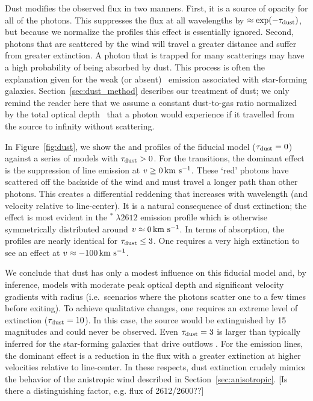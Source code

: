 \documentclass[12pt,preprint]{aastex}
\begin{document}
Dust modifies the observed flux in two manners. 
First, it is a source of opacity for all of 
the photons.  This suppresses the flux at all
wavelengths by $\approx \exp(-\tau_{\rm dust})$, but because we normalize the profiles 
this effect is essentially ignored.  Second, photons that are
scattered by the wind will travel a greater
distance and suffer from greater extinction.  A photon that is
trapped for many scatterings may have a high probability of being absorbed
by dust.  This process is
often the explanation given for the weak (or absent) \lya\ emission
associated with star-forming galaxies. 
Section~\ref{sec:dust_method} describes our treatment of dust; we only
remind the reader here that we assume a constant dust-to-gas ratio 
normalized by the total optical
depth \taud\ that a photon would experience if it travelled from the
source to infinity without scattering. 

In Figure~\ref{fig:dust}, we show the  and 
profiles of the fiducial model ($\tau_{\rm dust} = 0$) against a series of
models with $\tau_{\rm dust} > 0$.  For the  transitions, the
dominant effect is the suppression of line emission at $v \ge 0
\, {\rm km~s^{-1}}$.  These `red' photons have scattered off the
backside of the wind and must travel a longer path than other
photons.  This creates a differential reddening that increases with wavelength (and
velocity relative to line-center). It is a natural consequence of dust
extinction;  the effect is most evident in the $^* \; \lambda 2612$
emission profile which is otherwise symmetrically distributed around
$v \approx 0 \, {\rm km~s^{-1}}$.   In terms of absorption, the profiles are
nearly identical for $\tau_{\rm dust} \le 3$.  One requires a very high
extinction to see an effect at $v \approx -100 \, {\rm km~s^{-1}}$.

We conclude that dust has only a modest influence on this fiducial model and,
by inference, models with moderate peak optical depth and
significant velocity gradients with radius (i.e.\ scenarios where the
photons scatter one to a few times before exiting).
To achieve qualitative changes, one requires an extreme level of
extinction ($\tau_{\rm dust} = 10$).  In this case, the source would be
extinguished by 15\,magnitudes and could never be observed. 
Even $\tau_{\rm dust} = 3$ is larger than typically inferred for the
star-forming galaxies that drive outflows \citep[e.g.][]{dust}.
For the emission lines,
the dominant effect is a reduction in the flux 
with a greater extinction at higher velocities relative to line-center.
In these respects, dust extinction crudely mimics the behavior of the anistropic
wind described in Section~\ref{sec:anisotropic}. [Is there a
distinguishing factor, e.g. flux of 2612/2600??]
\end{document}
